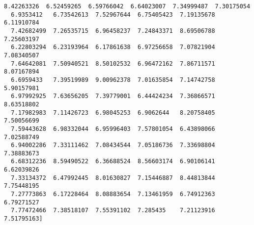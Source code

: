 \documentclass[11pt]{article}
\begin{document}
\begin{Verbatim}[commandchars=\\\{\}]
  8.42263326  6.52459265  6.59766042  6.64023007  7.34999487  7.30175054
  6.9353412   6.73542613  7.52967644  6.75405423  7.19135678  6.11910784
  7.42682499  7.26535715  6.96458237  7.24843371  8.69506788  7.25603197
  6.22803294  6.23193964  6.17861638  6.97256658  7.07821904  7.08340507
  7.64642081  7.50940521  8.50102532  6.96472162  7.86711571  8.07167894
  6.6959433   7.39519989  9.00962378  7.01635854  7.14742758  5.90157981
  6.97992925  7.63656205  7.39779001  6.44424234  7.36866571  8.63518802
  7.17982983  7.11426723  6.98045253  6.9062644   8.20758405  7.50056699
  7.59443628  6.98332044  6.95996403  7.57801054  6.43898066  7.02588749
  6.94002286  7.33111462  7.08434544  7.05186736  7.33698804  7.38883673
  6.68312236  8.59490522  6.36688524  8.56603174  6.90106141  6.62039826
  7.33134372  6.47992445  8.01630827  7.15446887  8.44813844  7.75448195
  7.27773863  6.17228464  8.08883654  7.13461959  6.74912363  6.79271527
  7.77472466  7.38518107  7.55391102  7.285435    7.21123916  7.51795163] 
 

\end{Verbatim}
\end{document}
